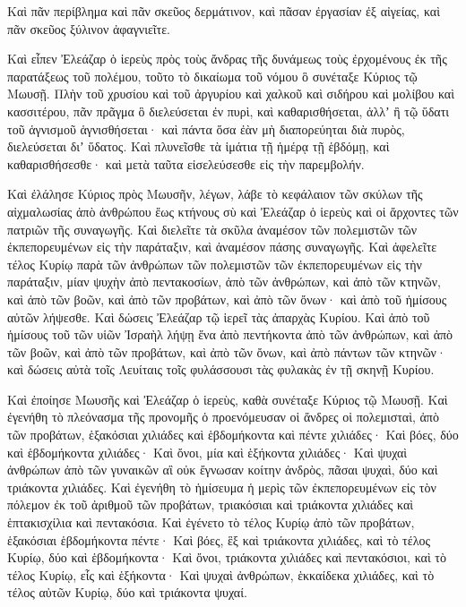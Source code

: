 {Καὶ πᾶν περίβλημα καὶ πᾶν σκεῦος δερμάτινον, καὶ πᾶσαν ἐργασίαν ἐξ αἰγείας, καὶ πᾶν σκεῦος ξύλινον ἀφαγνιεῖτε.
\par }{\PP {}Καὶ εἶπεν Ἐλεάζαρ ὁ ἱερεὺς πρὸς τοὺς ἄνδρας τῆς δυνάμεως τοὺς ἐρχομένους ἐκ τῆς παρατάξεως τοῦ πολέμου, τοῦτο τὸ δικαίωμα τοῦ νόμου ὃ συνέταξε Κύριος τῷ Μωυσῇ.
Πλὴν τοῦ χρυσίου καὶ τοῦ ἀργυρίου καὶ χαλκοῦ καὶ σιδήρου καὶ μολίβου καὶ κασσιτέρου,
πᾶν πρᾶγμα ὃ διελεύσεται ἐν πυρὶ, καὶ καθαρισθήσεται, ἀλλʼ ἢ τῷ ὕδατι τοῦ ἁγνισμοῦ ἁγνισθήσεται· καὶ πάντα ὅσα ἐὰν μὴ διαπορεύηται διὰ πυρὸς, διελεύσεται διʼ ὕδατος.
Καὶ πλυνεῖσθε τὰ ἱμάτια τῇ ἡμέρᾳ τῇ ἑβδόμῃ, καὶ καθαρισθήσεσθε· καὶ μετὰ ταῦτα εἰσελεύσεσθε εἰς τὴν παρεμβολήν.
\par }{\PP {}Καὶ ἐλάλησε Κύριος πρὸς Μωυσῆν, λέγων,
λάβε τὸ κεφάλαιον τῶν σκύλων τῆς αἰχμαλωσίας ἀπὸ ἀνθρώπου ἕως κτήνους σὺ καὶ Ἐλεάζαρ ὁ ἱερεὺς καὶ οἱ ἄρχοντες τῶν πατριῶν τῆς συναγωγῆς.
Καὶ διελεῖτε τὰ σκῦλα ἀναμέσον τῶν πολεμιστῶν τῶν ἐκπεπορευμένων εἰς τὴν παράταξιν, καὶ ἀναμέσον πάσης συναγωγῆς.
Καὶ ἀφελεῖτε τέλος Κυρίῳ παρὰ τῶν ἀνθρώπων τῶν πολεμιστῶν τῶν ἐκπεπορευμένων εἰς τὴν παράταξιν, μίαν ψυχὴν ἀπὸ πεντακοσίων, ἀπὸ τῶν ἀνθρώπων, καὶ ἀπὸ τῶν κτηνῶν, καὶ ἀπὸ τῶν βοῶν, καὶ ἀπὸ τῶν προβάτων, καὶ ἀπὸ τῶν ὄνων·
καὶ ἀπὸ τοῦ ἡμίσους αὐτῶν λήψεσθε. Καὶ δώσεις Ἐλεάζαρ τῷ ἱερεῖ τὰς ἀπαρχὰς Κυρίου.
Καὶ ἀπὸ τοῦ ἡμίσους τοῦ τῶν υἱῶν Ἰσραὴλ λήψῃ ἕνα ἀπὸ πεντήκοντα ἀπὸ τῶν ἀνθρώπων, καὶ ἀπὸ τῶν βοῶν, καὶ ἀπὸ τῶν προβάτων, καὶ ἀπὸ τῶν ὄνων, καὶ ἀπὸ πάντων τῶν κτηνῶν· καὶ δώσεις αὐτὰ τοῖς Λευίταις τοῖς φυλάσσουσι τὰς φυλακὰς ἐν τῇ σκηνῇ Κυρίου.
\par }{\PP {}Καὶ ἐποίησε Μωυσῆς καὶ Ἐλεάζαρ ὁ ἱερεὺς, καθὰ συνέταξε Κύριος τῷ Μωυσῇ.
Καὶ ἐγενήθη τὸ πλεόνασμα τῆς προνομῆς ὁ προενόμευσαν οἱ ἄνδρες οἱ πολεμισταὶ, ἀπὸ τῶν προβάτων, ἑξακόσιαι χιλιάδες καὶ ἑβδομήκοντα καὶ πέντε χιλιάδες·
Καὶ βόες, δύο καὶ ἑβδομήκοντα χιλιάδες·
Καὶ ὄνοι, μία καὶ ἑξήκοντα χιλιάδες·
Καὶ ψυχαὶ ἀνθρώπων ἀπὸ τῶν γυναικῶν αἳ οὐκ ἔγνωσαν κοίτην ἀνδρὸς, πᾶσαι ψυχαὶ, δύο καὶ τριάκοντα χιλιάδες.
Καὶ ἐγενήθη τὸ ἡμίσευμα ἡ μερὶς τῶν ἐκπεπορευμένων εἰς τὸν πόλεμον ἐκ τοῦ ἀριθμοῦ τῶν προβάτων, τριακόσιαι καὶ τριάκοντα χιλιάδες καὶ ἑπτακισχίλια καὶ πεντακόσια.
Καὶ ἐγένετο τὸ τέλος Κυρίῳ ἀπὸ τῶν προβάτων, ἑξακόσιαι ἑβδομήκοντα πέντε·
Καὶ βόες, ἓξ καὶ τριάκοντα χιλιάδες, καὶ τὸ τέλος Κυρίῳ, δύο καὶ ἑβδομήκοντα·
Καὶ ὄνοι, τριάκοντα χιλιάδες καὶ πεντακόσιοι, καὶ τὸ τέλος Κυρίῳ, εἷς καὶ ἑξήκοντα·
Καὶ ψυχαὶ ἀνθρώπων, ἑκκαίδεκα χιλιάδες, καὶ τὸ τέλος αὐτῶν Κυρίῳ, δύο καὶ τριάκοντα ψυχαί.
}
